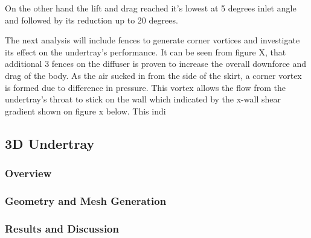 \noindent On the other hand the lift and drag reached it's lowest at 5 degrees inlet angle and followed by its reduction up to 20 degrees. %

\noindent The next analysis will include fences to generate corner vortices and investigate its effect on the undertray's performance. It can be seen from figure X, that additional 3 fences on the diffuser is proven to increase the overall downforce and drag of the body. As the air sucked in from the side of the skirt, a corner vortex is formed due to difference in pressure. This vortex allows the flow from the undertray's throat to stick on the wall which indicated by the x-wall shear gradient shown on figure x below. This indi









\subsection{3D Undertray}

\subsubsection{Overview}
\subsubsection{Geometry and Mesh Generation}
\subsubsection{Results and Discussion}
